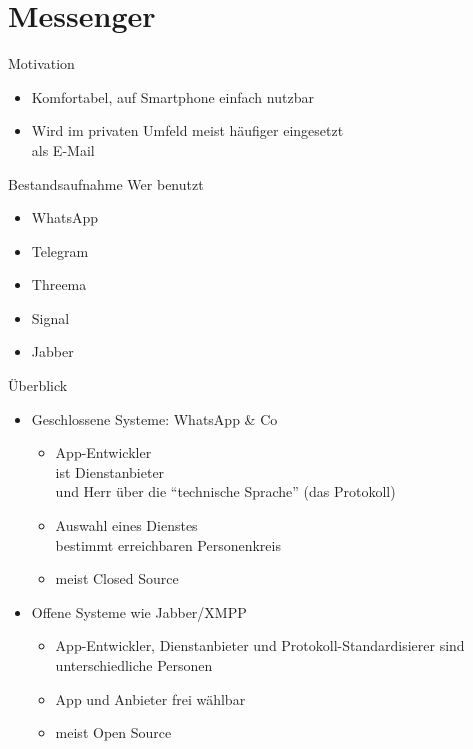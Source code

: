 \section{Messenger}
\begin{frame}{Motivation}
\begin{itemize}
\item Komfortabel, auf Smartphone einfach nutzbar
\item Wird im privaten Umfeld meist häufiger eingesetzt\\ als E-Mail
\end{itemize}

\pause
\begin{block}{Bestandsaufnahme}
Wer benutzt
\begin{itemize}
\item<+-> WhatsApp
\item<+-> Telegram
\item<+-> Threema
\item<+-> Signal
\item<+-> Jabber
\end{itemize}
\end{block}
\end{frame}

\begin{frame}{Überblick}
  \begin{itemize}
    \item Geschlossene Systeme: WhatsApp \& Co
      \begin{itemize}
        \item App-Entwickler\\
          ist Dienstanbieter\\
          und Herr über die ``technische Sprache'' (das Protokoll)
        \item Auswahl eines Dienstes\\bestimmt erreichbaren Personenkreis
        \item meist Closed Source
      \end{itemize}
    \item Offene Systeme wie Jabber/XMPP
      \begin{itemize}
        \item App-Entwickler, Dienstanbieter und Protokoll-Standardisierer sind unterschiedliche Personen
        \item App und Anbieter frei wählbar
        \item meist Open Source
      \end{itemize}
  \end{itemize}
\end{frame}

